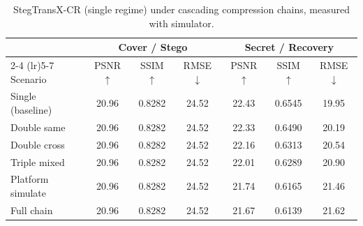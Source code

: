 \begin{table}[t]
\centering
\caption{StegTransX-CR (single regime) under cascading compression chains, measured with simulator.}
\label{tab:single-cascade-sim}
\begin{tabular}{lcccccc}
\toprule
& \multicolumn{3}{c}{Cover / Stego} & \multicolumn{3}{c}{Secret / Recovery} \\
\cmidrule(lr){2-4} \cmidrule(lr){5-7}
Scenario & PSNR $\uparrow$ & SSIM $\uparrow$ & RMSE $\downarrow$ & PSNR $\uparrow$ & SSIM $\uparrow$ & RMSE $\downarrow$ \\
\midrule
Single (baseline) & 20.96 & 0.8282 & 24.52 & 22.43 & 0.6545 & 19.95 \\
Double same & 20.96 & 0.8282 & 24.52 & 22.33 & 0.6490 & 20.19 \\
Double cross & 20.96 & 0.8282 & 24.52 & 22.16 & 0.6313 & 20.54 \\
Triple mixed & 20.96 & 0.8282 & 24.52 & 22.01 & 0.6289 & 20.90 \\
Platform simulate & 20.96 & 0.8282 & 24.52 & 21.74 & 0.6165 & 21.46 \\
Full chain & 20.96 & 0.8282 & 24.52 & 21.67 & 0.6139 & 21.62 \\
\bottomrule
\end{tabular}
\end{table}

